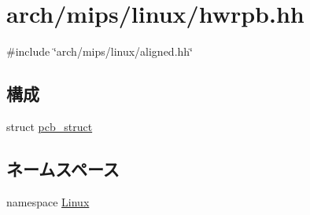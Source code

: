 \hypertarget{hwrpb_8hh}{
\section{arch/mips/linux/hwrpb.hh}
\label{hwrpb_8hh}
}
{\ttfamily \#include \char`\"{}arch/mips/linux/aligned.hh\char`\"{}}\par
\subsection*{構成}
\begin{DoxyCompactItemize}
\item 
struct \hyperlink{structLinux_1_1pcb__struct}{pcb\_\-struct}
\end{DoxyCompactItemize}
\subsection*{ネームスペース}
\begin{DoxyCompactItemize}
\item 
namespace \hyperlink{namespaceLinux}{Linux}
\end{DoxyCompactItemize}

